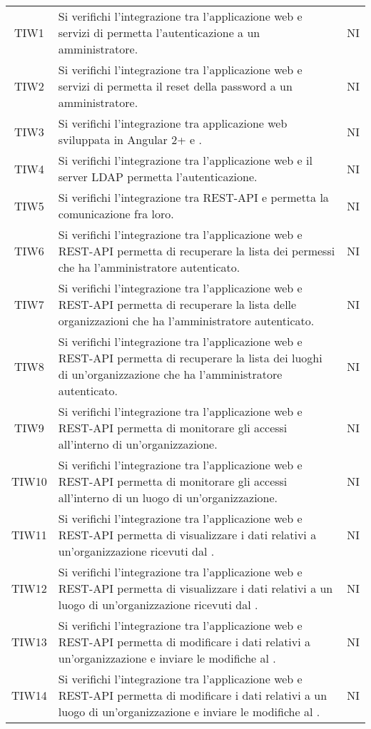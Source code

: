 {\begin{longtable}{ c C{13cm} C{1cm}}
TIW1 & Si verifichi l’integrazione tra l’applicazione web e servizi di  permetta l’autenticazione a un amministratore. & NI \\
TIW2 & Si verifichi l’integrazione tra l’applicazione web e servizi di  permetta il reset della password a un amministratore. & NI \\
TIW3 & Si verifichi l’integrazione tra applicazione web sviluppata in Angular 2+ e .& NI \\
TIW4 & Si verifichi l’integrazione tra l’applicazione web e il server LDAP permetta l’autenticazione.& NI \\
TIW5 & Si verifichi l’integrazione tra REST-API e  permetta la comunicazione fra loro.& NI \\
TIW6 & Si verifichi l’integrazione tra l’applicazione web e REST-API permetta di recuperare la lista dei permessi che ha l’amministratore autenticato.& NI \\
TIW7 & Si verifichi l’integrazione tra l’applicazione web e REST-API permetta di recuperare la lista delle organizzazioni che ha l’amministratore autenticato.& NI \\
TIW8 & Si verifichi l’integrazione tra l’applicazione web e REST-API permetta di recuperare la lista dei luoghi di un’organizzazione che ha l’amministratore autenticato.& NI \\
TIW9 & Si verifichi l’integrazione tra l’applicazione web e REST-API permetta di monitorare gli accessi all’interno di un’organizzazione.& NI \\
TIW10 & Si verifichi l’integrazione tra l’applicazione web e REST-API permetta di monitorare gli accessi all’interno di un luogo di un’organizzazione.& NI \\
TIW11 & Si verifichi l’integrazione tra l’applicazione web e REST-API permetta di visualizzare i dati relativi a un’organizzazione ricevuti dal .& NI \\
TIW12 & Si verifichi l’integrazione tra l’applicazione web e REST-API permetta di visualizzare i dati relativi a un luogo di un’organizzazione ricevuti dal .& NI \\
TIW13 & Si verifichi l’integrazione tra l’applicazione web e REST-API permetta di modificare i dati relativi a un’organizzazione e inviare le modifiche al .& NI \\
TIW14 & Si verifichi l’integrazione tra l’applicazione web e REST-API permetta di modificare i dati relativi a un luogo di un’organizzazione e inviare le modifiche al .& NI \\

\end{longtable}}
